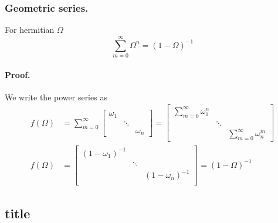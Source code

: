 \documentclass[../main.tex]{subfiles}
\begin{document}
\subsubsection*{Geometric series.}
For hermitian $\Omega$
\begin{equation*}
	\sum_{m=0}^{\infty}\Omega^n=(1-\Omega)^{-1}
\end{equation*}

\paragraph*{Proof.}
We write the power series as
\begin{align*}
	f(\Omega) & =\sum_{m=0}^{\infty}
	\begin{bmatrix}
		\omega_1 &        &          \\
		         & \ddots &          \\
		         &        & \omega_n
	\end{bmatrix}
	=
	\begin{bmatrix}
		\sum_{m=0}^{\infty}\omega_1^n &        &                               \\
		                              & \ddots &                               \\
		                              &        & \sum_{m=0}^{\infty}\omega_n^m
	\end{bmatrix} \\
	f(\Omega) & =
	\begin{bmatrix}
		(1-\omega_1)^{-1} &        &                   \\
		                  & \ddots &                   \\
		                  &        & (1-\omega_n)^{-1} \\
	\end{bmatrix}
	=(1-\Omega)^{-1}
\end{align*}

\subsection*{title}
\end{document}
